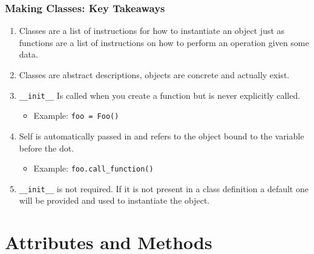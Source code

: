 \documentclass{beamer}
\begin{document}
%
%
\begin{frame}[fragile]
    \frametitle{Making Classes: Key Takeaways}

    \begin{enumerate}
        \item Classes are a list of instructions for how to instantiate an object just as functions are a list of instructions on how to perform an operation given some data.
            \pause
        \item Classes are abstract descriptions, objects are concrete and actually exist.
            \pause
        \item \lstinline|__init__| Is called when you create a function but is never explicitly called.
            \begin{itemize}
                \item Example: \lstinline|foo = Foo()|
            \end{itemize}
            \pause
        \item Self is automatically passed in and refers to the object bound to the variable before the dot.
            \begin{itemize}
                \item Example: \lstinline|foo.call_function()|
            \end{itemize}
            \pause
        \item \lstinline|__init__| is not required. If it is not present in a class definition a default one will be provided and used to instantiate the object.
    \end{enumerate}

\end{frame}

\section{Attributes and Methods}
\end{document}

